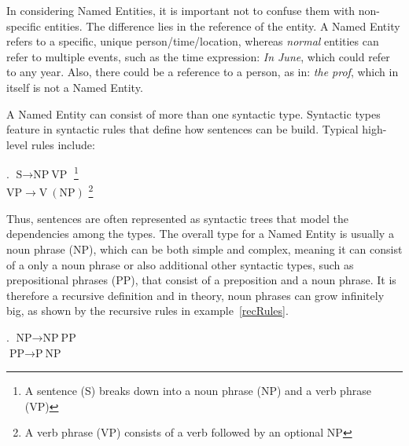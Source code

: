\documentclass[11pt]{article}
\newcommand{\namedentity}{Named Entity}
\begin{document}
In considering Named Entities, it is important not to confuse them with non-specific entities. %
The difference lies in the reference of the entity. A Named Entity refers to a specific, unique person/time/location, whereas
\emph{normal} entities can refer to multiple events, such as the time expression: \emph{In June}, which could refer to any year.
Also, there could be a reference to a person, as in: \emph{the prof}, which in itself is not a \namedentity.

A Named Entity can consist of more than one syntactic type. Syntactic types feature in syntactic rules that define how sentences can be build.
Typical high-level rules include:

\ex. $\text{S} \rightarrow \text{NP}\  \text{VP} $ \footnote{ A sentence (S) breaks down into a noun phrase (NP) and a verb phrase (VP)} \\
$ \text{VP} \rightarrow \text{V}\  (\text{NP})$ \footnote{ A verb phrase (VP) consists of a verb followed by an optional NP} 

Thus, sentences are often represented as syntactic trees that model the dependencies among the types.
The overall type for a Named Entity is usually a noun phrase (NP), which can be both simple and complex, meaning it can consist of a only a noun phrase or 
also additional other syntactic types, such as prepositional phrases (PP), that consist of a preposition and a noun phrase. 
It is therefore a recursive definition and in theory, noun phrases can grow infinitely big, as shown by the recursive rules in example~\ref{recRules}.  %

\ex. $ \text{NP} \rightarrow \text{NP} \  \text{PP}$ \\ \label{recRules}
     $ \text{PP} \rightarrow \text{P} \  \text{NP}$ 
 

% 
\end{document}
